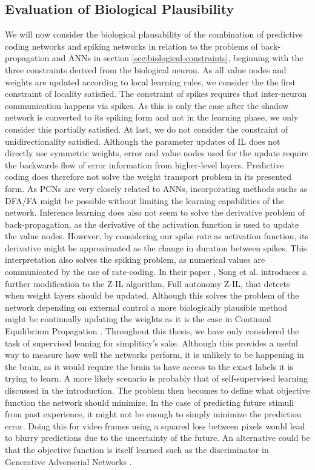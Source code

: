 \documentclass[a4paper,11pt]{article} %
\begin{document}
\subsection{Evaluation of Biological Plausibility}
We will now consider the biological plausability of the combination of predictive coding networks and spiking networks in relation to the problems of back-propagation and ANNs in section \ref{sec:biological-constraints}, beginning with the three constraints derived from the biological neuron. As all value nodes and weights are updated according to local learning rules, we consider the the first constraint of locality satisfied. The constraint of spikes requires that inter-neuron communication happens via spikes. As this is only the case after the shadow network is converted to its spiking form and not in the learning phase, we only consider this partially satisfied. At last, we do not consider the constraint of unidirectionality satisfied. Although the parameter updates of IL does not directly use symmetric weights, error and value nodes used for the update require the backwards flow of error information from higher-level layers. Predictive coding does therefore not solve the weight transport problem in its presented form. As PCNs are very closely related to ANNs, incorporating methods suchs as DFA/FA might be possible without limiting the learning capabilities of the network. Inference learning does also not seem to solve the derivative problem of back-propagation, as the derivative of the activation function is used to update the value nodes. However, by considering our spike rate as activation function, its derivative might be approximated as the change in duration between spikes. This interpretation also solves the spiking problem, as numerical values are communicated by the use of rate-coding. In their paper \cite{PredictiveCodingNetworks}, Song et al. introduces a further modification to the Z-IL algorithm, Full autonomy Z-IL, that detects when weight layers should be updated. Although this solves the problem of the network depending on external control a more biologically plausible method might be continually updating the weights as it is the case in Continual Equilibrium Propagation \cite{ContinualEqProp}.  Throughout this thesis, we have only considered the task of supervised leaning for simpliticy's sake. Although this provides a useful way to measure how well the networks perform, it is unlikely to be happening in the brain, as it would require the brain to have access to the exact labels it is trying to learn. A more likely scenario is probably that of self-supervised learning discussed in the introduction. The problem then becomes to define what objective function the network should minimize. In the case of predicting future stimuli from past experience, it might not be enough to simply minimize the prediction error. Doing this for video frames using a squared loss between pixels would lead to blurry predictions due to the uncertainty of the future. An alternative could be that the objective function is itself learned such as the discriminator in Generative Adverserial Networks \cite{goodfellow2014generative}. 
\end{document}
